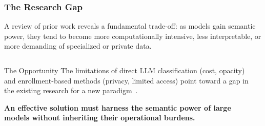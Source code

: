 \documentclass[aspectratio=169,10pt]{beamer}
\begin{document}
\begin{frame}
    \frametitle{The Research Gap}
    
    A review of prior work reveals a fundamental trade-off: as models gain semantic power, they tend to become more computationally intensive, less interpretable, or more demanding of specialized or private data.
    
    \begin{columns}[T]
        \begin{column}{0.4\textwidth}
            \begin{alertblock}{The Opportunity}
                The limitations of direct LLM classification (cost, opacity) and enrollment-based methods (privacy, limited access) point toward a gap in the existing research for a new paradigm~\cite{pardos-articulation-2019, slade10.1177/0002764213479366}.
                \vspace{1em}
                
                \textbf{An effective solution must harness the semantic power of large models without inheriting their operational burdens.}
            \end{alertblock}
        \end{column}

        \begin{column}{0.55\textwidth}
\end{column}
\end{columns}
\end{frame}
\end{document}
